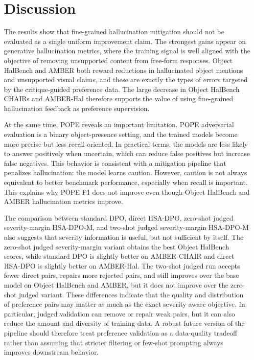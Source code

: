 \documentclass{article}
\begin{document}
\section{Discussion}

The results show that fine-grained hallucination mitigation should not be evaluated as a single uniform improvement claim. The strongest gains appear on generative hallucination metrics, where the training signal is well aligned with the objective of removing unsupported content from free-form responses. Object HalBench and AMBER both reward reductions in hallucinated object mentions and unsupported visual claims, and these are exactly the types of errors targeted by the critique-guided preference data. The large decrease in Object HalBench CHAIRs and AMBER-Hal therefore supports the value of using fine-grained hallucination feedback as preference supervision.

At the same time, POPE reveals an important limitation. POPE adversarial evaluation is a binary object-presence setting, and the trained models become more precise but less recall-oriented. In practical terms, the models are less likely to answer positively when uncertain, which can reduce false positives but increase false negatives. This behavior is consistent with a mitigation pipeline that penalizes hallucination: the model learns caution. However, caution is not always equivalent to better benchmark performance, especially when recall is important. This explains why POPE F1 does not improve even though Object HalBench and AMBER hallucination metrics improve.

The comparison between standard DPO, direct HSA-DPO, zero-shot judged severity-margin HSA-DPO-M, and two-shot judged severity-margin HSA-DPO-M also suggests that severity information is useful, but not sufficient by itself. The zero-shot judged severity-margin variant obtains the best Object HalBench scores, while standard DPO is slightly better on AMBER-CHAIR and direct HSA-DPO is slightly better on AMBER-Hal. The two-shot judged run accepts fewer direct pairs, repairs more rejected pairs, and still improves over the base model on Object HalBench and AMBER, but it does not improve over the zero-shot judged variant. These differences indicate that the quality and distribution of preference pairs may matter as much as the exact severity-aware objective. In particular, judged validation can remove or repair weak pairs, but it can also reduce the amount and diversity of training data. A robust future version of the pipeline should therefore treat preference validation as a data-quality tradeoff rather than assuming that stricter filtering or few-shot prompting always improves downstream behavior.
\end{document}
